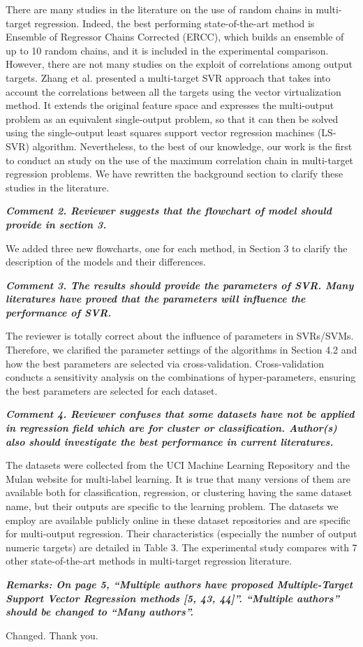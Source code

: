 \documentclass[a4paper,notitlepage]{article}
\begin{document}
\noindent There are many studies in the literature on the use of random chains in multi-target regression. Indeed, the best performing state-of-the-art method is Ensemble of Regressor Chains Corrected (ERCC), which builds an ensemble of up to 10 random chains, and it is included in the experimental comparison. However, there are not many studies on the exploit of correlations among output targets. Zhang et al. presented a multi-target SVR approach that takes into account the correlations between all the targets using the vector virtualization method. It extends the original feature space and expresses the multi-output problem as an equivalent single-output problem, so that it can then be solved using the single-output least squares support vector regression machines (LS-SVR) algorithm. Nevertheless, to the best of our knowledge, our work is the first to conduct an study on the use of the maximum correlation chain in multi-target regression problems. We have rewritten the background section to clarify these studies in the literature.

\noindent \textbf{\textit{Comment 2. Reviewer suggests that the flowchart of model should provide in section 3. }}

\medskip

\noindent We added three new flowcharts, one for each method, in Section 3 to clarify the description of the models and their differences.

\noindent \textbf{\textit{Comment 3. The results should provide the parameters of SVR. Many literatures have proved that the parameters will influence the performance of SVR.}}

\medskip

\noindent The reviewer is totally correct about the influence of parameters in SVRs/SVMs. Therefore, we clarified the parameter settings of the algorithms in Section 4.2 and how the best parameters are selected via cross-validation. Cross-validation conducts a sensitivity analysis on the combinations of hyper-parameters, ensuring the best parameters are selected for each dataset.

\noindent \textbf{\textit{Comment 4. Reviewer confuses that some datasets have not be applied in regression field which are for cluster or classification. Author(s) also should investigate the best performance in current literatures.}}

\medskip

\noindent The datasets were collected from the UCI Machine Learning Repository and the Mulan website for multi-label learning. It is true that many versions of them are available both for classification, regression, or clustering having the same dataset name, but their outputs are specific to the learning problem. The datasets we employ are available publicly online in these dataset repositories and are specific for multi-output regression. Their characteristics (especially the number of output numeric targets) are detailed in Table 3. The experimental study compares with 7 other state-of-the-art methods in multi-target regression literature.

\newpage
\noindent \textbf{\textit{Remarks: On page 5, ``Multiple authors have proposed Multiple-Target Support Vector Regression methods [5, 43, 44]''. ``Multiple authors'' should be changed to ``Many authors''.}}

\medskip

\noindent Changed. Thank you.
\end{document}
